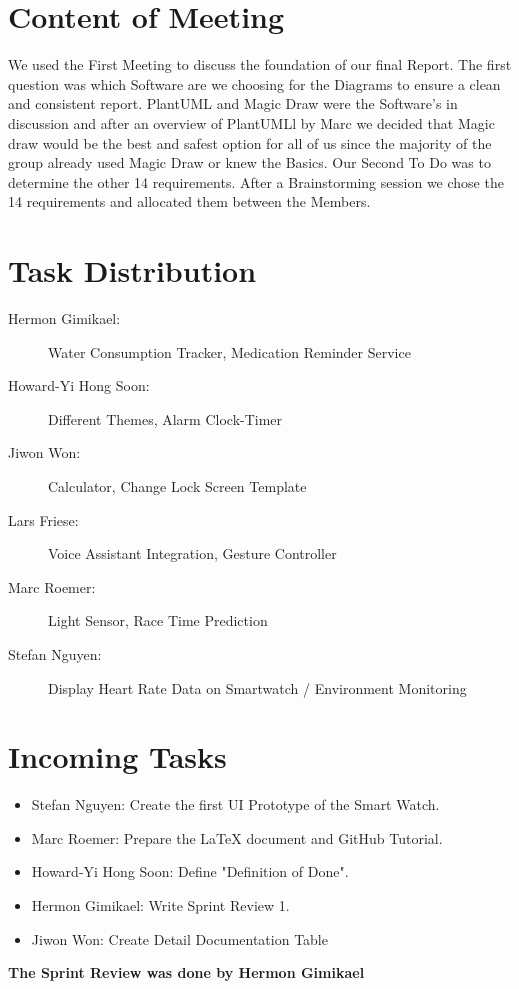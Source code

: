 \documentclass{article}
\begin{document}
\section*{Content of Meeting}
We used the First Meeting to discuss the foundation of our final Report. The first question was which Software are we choosing for the Diagrams to ensure a clean and consistent report. PlantUML and Magic Draw were the Software’s in discussion and after an overview of PlantUMLl by Marc we decided that Magic draw would be the best and safest option for all of us since the majority of the group already used Magic Draw or knew the Basics. Our Second To Do was to determine the other 14 requirements. After a Brainstorming session we chose the 14 requirements and allocated them between the Members.

\section*{Task Distribution}
\begin{description}
    \item[Hermon Gimikael:] Water Consumption Tracker, Medication Reminder Service
    \item[Howard-Yi Hong Soon:] Different Themes, Alarm Clock-Timer
    \item[Jiwon Won:] Calculator, Change Lock Screen Template
    \item[Lars Friese:] Voice Assistant Integration, Gesture Controller
    \item[Marc Roemer:] Light Sensor, Race Time Prediction
    \item[Stefan Nguyen:] Display Heart Rate Data on Smartwatch / Environment Monitoring
\end{description}

\section*{Incoming Tasks}
\begin{itemize}
    \item Stefan Nguyen: Create the first UI Prototype of the Smart Watch.
    \item Marc Roemer: Prepare the LaTeX document and GitHub Tutorial.
    \item Howard-Yi Hong Soon: Define "Definition of Done".
    \item Hermon Gimikael: Write Sprint Review 1.
    \item Jiwon Won: Create Detail Documentation Table
\end{itemize}
\noindent
\textbf{The Sprint Review was done by Hermon Gimikael}
\newpage
\end{document}
